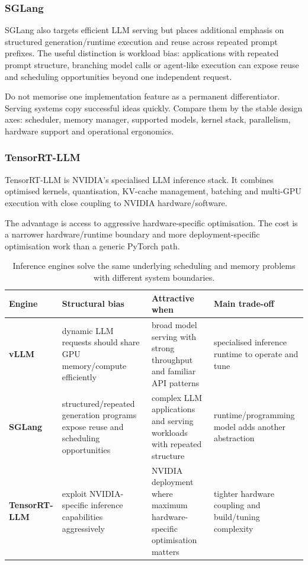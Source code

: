 \subsubsection*{SGLang}

SGLang also targets efficient LLM serving but places additional emphasis on structured generation/runtime execution and reuse across repeated prompt prefixes.
The useful distinction is workload bias: applications with repeated prompt structure, branching model calls or agent-like execution can expose reuse and scheduling opportunities beyond one independent request.

Do not memorise one implementation feature as a permanent differentiator.
Serving systems copy successful ideas quickly.
Compare them by the stable design axes: scheduler, memory manager, supported models, kernel stack, parallelism, hardware support and operational ergonomics.

\subsubsection*{TensorRT-LLM}

TensorRT-LLM is NVIDIA's specialised LLM inference stack.
It combines optimised kernels, quantisation, KV-cache management, batching and multi-GPU execution with close coupling to NVIDIA hardware/software.

The advantage is access to aggressive hardware-specific optimisation.
The cost is a narrower hardware/runtime boundary and more deployment-specific optimisation work than a generic PyTorch path.

\begin{table}[ht]
\centering
\small
\begin{tabularx}{\textwidth}{>{\bfseries}p{2.3cm} X X X}
\toprule
Engine & Structural bias & Attractive when & Main trade-off \\
\midrule
vLLM & dynamic LLM requests should share GPU memory/compute efficiently & broad model serving with strong throughput and familiar API patterns & specialised inference runtime to operate and tune \\
SGLang & structured/repeated generation programs expose reuse and scheduling opportunities & complex LLM applications and serving workloads with repeated structure & runtime/programming model adds another abstraction \\
TensorRT-LLM & exploit NVIDIA-specific inference capabilities aggressively & NVIDIA deployment where maximum hardware-specific optimisation matters & tighter hardware coupling and build/tuning complexity \\
\bottomrule
\end{tabularx}
\caption{Inference engines solve the same underlying scheduling and memory problems with different system boundaries.}
\label{tab:llm-engines}
\end{table}

